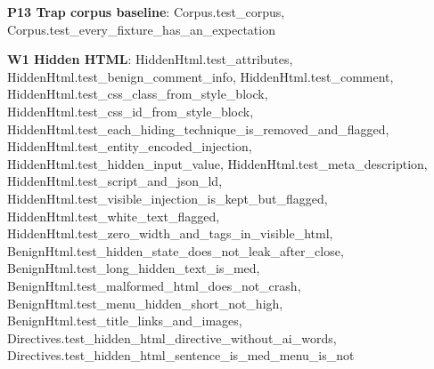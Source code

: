 \documentclass[10pt,a4paper]{article}
\begin{document}
\textbf{P13 Trap corpus baseline}: \textcolor{ok}{Corpus.\allowbreak{}test\_\allowbreak{}corpus}, \textcolor{ok}{Corpus.\allowbreak{}test\_\allowbreak{}every\_\allowbreak{}fixture\_\allowbreak{}has\_\allowbreak{}an\_\allowbreak{}expectation}\par
\textbf{W1 Hidden HTML}: \textcolor{ok}{HiddenHtml.\allowbreak{}test\_\allowbreak{}attributes}, \textcolor{ok}{HiddenHtml.\allowbreak{}test\_\allowbreak{}benign\_\allowbreak{}comment\_\allowbreak{}info}, \textcolor{ok}{HiddenHtml.\allowbreak{}test\_\allowbreak{}comment}, \textcolor{ok}{HiddenHtml.\allowbreak{}test\_\allowbreak{}css\_\allowbreak{}class\_\allowbreak{}from\_\allowbreak{}style\_\allowbreak{}block}, \textcolor{ok}{HiddenHtml.\allowbreak{}test\_\allowbreak{}css\_\allowbreak{}id\_\allowbreak{}from\_\allowbreak{}style\_\allowbreak{}block}, \textcolor{ok}{HiddenHtml.\allowbreak{}test\_\allowbreak{}each\_\allowbreak{}hiding\_\allowbreak{}technique\_\allowbreak{}is\_\allowbreak{}removed\_\allowbreak{}and\_\allowbreak{}flagged}, \textcolor{ok}{HiddenHtml.\allowbreak{}test\_\allowbreak{}entity\_\allowbreak{}encoded\_\allowbreak{}injection}, \textcolor{ok}{HiddenHtml.\allowbreak{}test\_\allowbreak{}hidden\_\allowbreak{}input\_\allowbreak{}value}, \textcolor{ok}{HiddenHtml.\allowbreak{}test\_\allowbreak{}meta\_\allowbreak{}description}, \textcolor{ok}{HiddenHtml.\allowbreak{}test\_\allowbreak{}script\_\allowbreak{}and\_\allowbreak{}json\_\allowbreak{}ld}, \textcolor{ok}{HiddenHtml.\allowbreak{}test\_\allowbreak{}visible\_\allowbreak{}injection\_\allowbreak{}is\_\allowbreak{}kept\_\allowbreak{}but\_\allowbreak{}flagged}, \textcolor{ok}{HiddenHtml.\allowbreak{}test\_\allowbreak{}white\_\allowbreak{}text\_\allowbreak{}flagged}, \textcolor{ok}{HiddenHtml.\allowbreak{}test\_\allowbreak{}zero\_\allowbreak{}width\_\allowbreak{}and\_\allowbreak{}tags\_\allowbreak{}in\_\allowbreak{}visible\_\allowbreak{}html}, \textcolor{ok}{BenignHtml.\allowbreak{}test\_\allowbreak{}hidden\_\allowbreak{}state\_\allowbreak{}does\_\allowbreak{}not\_\allowbreak{}leak\_\allowbreak{}after\_\allowbreak{}close}, \textcolor{ok}{BenignHtml.\allowbreak{}test\_\allowbreak{}long\_\allowbreak{}hidden\_\allowbreak{}text\_\allowbreak{}is\_\allowbreak{}med}, \textcolor{ok}{BenignHtml.\allowbreak{}test\_\allowbreak{}malformed\_\allowbreak{}html\_\allowbreak{}does\_\allowbreak{}not\_\allowbreak{}crash}, \textcolor{ok}{BenignHtml.\allowbreak{}test\_\allowbreak{}menu\_\allowbreak{}hidden\_\allowbreak{}short\_\allowbreak{}not\_\allowbreak{}high}, \textcolor{ok}{BenignHtml.\allowbreak{}test\_\allowbreak{}title\_\allowbreak{}links\_\allowbreak{}and\_\allowbreak{}images}, \textcolor{ok}{Directives.\allowbreak{}test\_\allowbreak{}hidden\_\allowbreak{}html\_\allowbreak{}directive\_\allowbreak{}without\_\allowbreak{}ai\_\allowbreak{}words}, \textcolor{ok}{Directives.\allowbreak{}test\_\allowbreak{}hidden\_\allowbreak{}html\_\allowbreak{}sentence\_\allowbreak{}is\_\allowbreak{}med\_\allowbreak{}menu\_\allowbreak{}is\_\allowbreak{}not}\par
\end{document}
